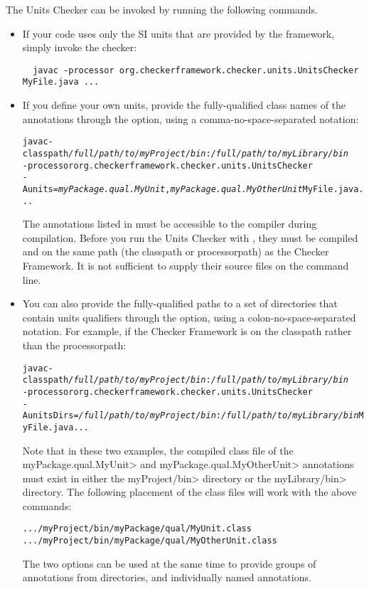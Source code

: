 
The Units Checker can be invoked by running the following commands.

\begin{itemize}
\item
If your code uses only the SI units that are provided by the
framework, simply invoke the checker:

\begin{Verbatim}
  javac -processor org.checkerframework.checker.units.UnitsChecker MyFile.java ...
\end{Verbatim}

\item
If you define your own units, provide the fully-qualified class names of the
annotations through the  option, using a comma-no-space-separated
notation:

\begin{alltt}
  javac -classpath \textit{/full/path/to/myProject/bin}:\textit{/full/path/to/myLibrary/bin} \ttbs
        -processor org.checkerframework.checker.units.UnitsChecker \ttbs
        -Aunits=\textit{myPackage.qual.MyUnit},\textit{myPackage.qual.MyOtherUnit} MyFile.java ...
\end{alltt}

The annotations listed in  must be accessible to
the compiler during compilation.  Before you run the Units Checker with
, they must be compiled and on the same path (the classpath or
processorpath) as the Checker Framework.  It
is not sufficient to supply their source files on the command line.

\item
You can also provide the fully-qualified paths to a set of directories
that contain units qualifiers through the  option,
using a colon-no-space-separated notation. For example,
if the Checker Framework is on the classpath rather than the processorpath:

\begin{alltt}
  javac -classpath \textit{/full/path/to/myProject/bin}:\textit{/full/path/to/myLibrary/bin} \ttbs
        -processor org.checkerframework.checker.units.UnitsChecker \ttbs
        -AunitsDirs=\textit{/full/path/to/myProject/bin}:\textit{/full/path/to/myLibrary/bin} MyFile.java ...
\end{alltt}

Note that in these two examples, the compiled class file of the
\<myPackage.qual.MyUnit> and \<myPackage.qual.MyOtherUnit> annotations
must exist in either the \<myProject/bin> directory or the
\<myLibrary/bin> directory. The following placement of the class files
will work with the above commands:

\begin{alltt}
  .../myProject/bin/myPackage/qual/MyUnit.class
  .../myProject/bin/myPackage/qual/MyOtherUnit.class
\end{alltt}

The two options can be used at the same time to provide groups of annotations
from directories, and individually named annotations.

\end{itemize}

